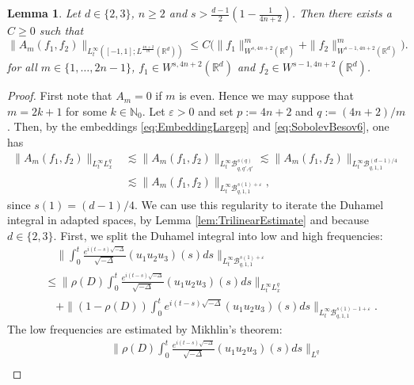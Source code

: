 \documentclass{amsart}
\newtheorem{lemma}[theorem]{Lemma}
\theoremstyle{definition}
\newcommand{\R}{\mathbb{R}}
\newcommand{\N}{\mathbb{N}}
\newcommand {\Rd}{\mathbb{R}^{d}}
\newcommand {\veps}{\varepsilon}
\numberwithin{equation}{section}
\begin{document}
\begin{lemma}
\label{lem:IterationAm}
Let $d \in \{2, 3 \}$, $n \geq 2$ and $s > \frac{d-1}{2}( 1 - \frac{1}{4n+2})$. Then there exists a $C\geq0$ such that
\[
\| A_m(f_{1},f_{2}) \|_{L_t^\infty([-1,1];L^{\frac{4n+2}{m}}(\R^d)) } \leq C\big( \| f_{1} \|^m_{W^{s,4n+2}(\R^d)} + \| f_{2} \|^m_{W^{s-1,4n+2}(\R^d)}\big).
\]
for all $m \in \{1,\ldots, 2n-1\}$, $f_{1}\in W^{s,4n+2}(\Rd)$ and $f_{2}\in W^{s-1,4n+2}(\Rd)$.
\end{lemma}
\begin{proof}
First note that $A_{m}=0$ if $m$ is even. Hence we may suppose that $m = 2k+1$ for some $k\in\N_{0}$. Let $\veps>0$ and set $p:=4n+2$ and $q:=(4n+2)/m$. Then, by the embeddings \eqref{eq:EmbeddingLargep} and \eqref{eq:SobolevBesov6}, one has
\begin{align*}
\| A_m (f_1,f_2) \|_{L_t^\infty L^{q}_{x}} &\lesssim \| A_m (f_1,f_2) \|_{L_t^\infty \mathcal{B}^{s(q)}_{q,q',q'}} \lesssim \| A_m(f_1,f_2) \|_{L_t^\infty \mathcal{B}^{(d-1)/4}_{q,1,1}}\\
&\lesssim \| A_m(f_1,f_2) \|_{L_t^\infty \mathcal{B}^{s(1)+\veps}_{q,1,1}},
\end{align*}
since $s(1)=(d-1)/4$. We can use this regularity to iterate the Duhamel integral in adapted spaces, by Lemma \ref{lem:TrilinearEstimate} and because $d \in \{2,3\}$. 
First, we split the Duhamel integral into low and high frequencies:
\begin{equation*}
\begin{split}
&\quad \big\| \int_0^t \frac{e^{i(t-s) \sqrt{- \Delta}}}{\sqrt{- \Delta}} (u_1 u_2 u_3) (s) ds \big\|_{L_t^\infty \mathcal{B}^{s(1)+\varepsilon}_{q,1,1}} \\
&\leq \| \rho(D) \int_0^t \frac{e^{i(t-s) \sqrt{-\Delta}}}{\sqrt{- \Delta}} (u_1 u_2 u_3) (s) ds \big\|_{L_t^\infty L_x^q} \\
&\quad + \| (1-\rho(D)) \int_0^t e^{i(t-s) \sqrt{-\Delta}} (u_1 u_2 u_3)(s) ds \|_{L_t^\infty \mathcal{B}^{s(1)-1+\varepsilon}_{q,1,1}}.
\end{split}
\end{equation*}
The low frequencies are estimated by Mikhlin's theorem:
\begin{equation*}
\begin{split}
&\quad \| \rho(D) \int_0^t \frac{e^{i(t-s) \sqrt{-\Delta}}}{\sqrt{-\Delta}} (u_1 u_2 u_3)(s) ds \|_{L^q} \\

\end{split}
\end{equation*}
\end{proof}
\end{document}
